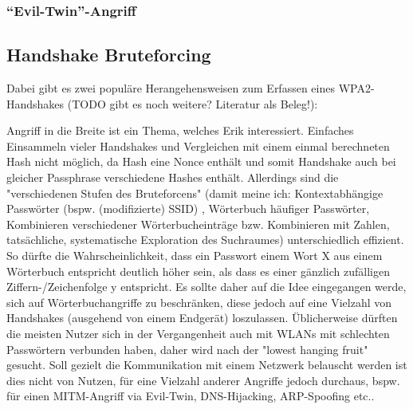 \subsubsection{\enquote{Evil-Twin}-Angriff}

\subsection{Handshake Bruteforcing}
Dabei gibt es zwei populäre Herangehensweisen zum Erfassen eines WPA2-Handshakes (TODO gibt es noch weitere? Literatur als Beleg!): 

Angriff in die Breite ist ein Thema, welches Erik interessiert. Einfaches Einsammeln vieler Handshakes und Vergleichen mit einem einmal berechneten Hash nicht möglich, da Hash eine Nonce enthält und somit Handshake auch bei gleicher Passphrase verschiedene Hashes enthält. Allerdings sind die "verschiedenen Stufen des Bruteforcens" (damit meine ich: Kontextabhängige Passwörter (bspw. (modifizierte) SSID) , Wörterbuch häufiger Passwörter, Kombinieren verschiedener Wörterbucheinträge bzw. Kombinieren mit Zahlen, tatsächliche, systematische Exploration des Suchraumes) unterschiedlich effizient. So dürfte die Wahrscheinlichkeit, dass ein Passwort einem Wort X aus einem Wörterbuch entspricht deutlich höher sein, als dass es einer gänzlich zufälligen Ziffern-/Zeichenfolge y entspricht. Es sollte daher auf die Idee eingegangen werde, sich auf Wörterbuchangriffe zu beschränken, diese jedoch auf eine Vielzahl von Handshakes (ausgehend von einem Endgerät) loszulassen. Üblicherweise dürften die meisten Nutzer sich in der Vergangenheit auch mit WLANs mit schlechten Passwörtern verbunden haben, daher wird nach der "lowest hanging fruit" gesucht. Soll gezielt die Kommunikation mit einem Netzwerk belauscht werden ist dies nicht von Nutzen, für eine Vielzahl anderer Angriffe jedoch durchaus, bspw. für einen MITM-Angriff via Evil-Twin, DNS-Hijacking, ARP-Spoofing etc..